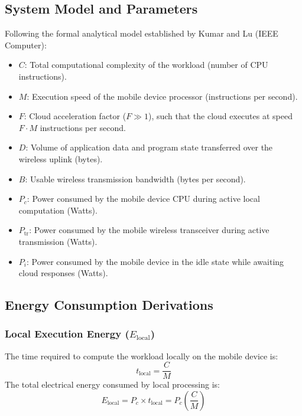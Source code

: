 \subsection{System Model and Parameters}
Following the formal analytical model established by Kumar and Lu (IEEE Computer):
\begin{itemize}[leftmargin=*]
  \item $C$: Total computational complexity of the workload (number of CPU instructions).
  \item $M$: Execution speed of the mobile device processor (instructions per second).
  \item $F$: Cloud acceleration factor ($F \gg 1$), such that the cloud executes at speed $F \cdot M$ instructions per second.
  \item $D$: Volume of application data and program state transferred over the wireless uplink (bytes).
  \item $B$: Usable wireless transmission bandwidth (bytes per second).
  \item $P_c$: Power consumed by the mobile device CPU during active local computation (Watts).
  \item $P_{\text{tr}}$: Power consumed by the mobile wireless transceiver during active transmission (Watts).
  \item $P_i$: Power consumed by the mobile device in the idle state while awaiting cloud responses (Watts).
\end{itemize}

\subsection{Energy Consumption Derivations}
\subsubsection{Local Execution Energy ($E_{\text{local}}$)}
The time required to compute the workload locally on the mobile device is:
\begin{equation}
t_{\text{local}} = \frac{C}{M}
\end{equation}
The total electrical energy consumed by local processing is:
\begin{equation}
E_{\text{local}} = P_c \times t_{\text{local}} = P_c \left( \frac{C}{M} \right)
\end{equation}

